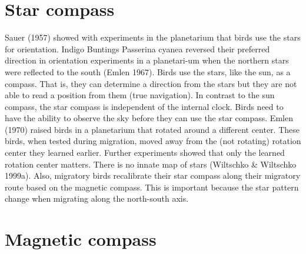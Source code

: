 \documentclass[
]{book}
\begin{document}
\hypertarget{star-compass}{%
\section{Star compass}\label{star-compass}}

Sauer (1957) showed with experiments in the planetarium that birds use the stars for orientation. Indigo Buntings Passerina cyanea reversed their preferred direction in orientation experiments in a planetari-um when the northern stars were reflected to the south (Emlen 1967). Birds use the stars, like the sun, as a compass. That is, they can determine a direction from the stars but they are not able to read a position from them (true navigation). In contrast to the sun compass, the star compass is independent of the internal clock. Birds need to have the ability to observe the sky before they can use the star compass. Emlen (1970) raised birds in a planetarium that rotated around a different center. These birds, when tested during migration, moved away from the (not rotating) rotation center they learned earlier. Further experiments showed that only the learned rotation center matters. There is no innate map of stars (Wiltschko \& Wiltschko 1999a). Also, migratory birds recalibrate their star compass along their migratory route based on the magnetic compass. This is important because the star pattern change when migrating along the north-south axis.

\hypertarget{magnetic-compass}{%
\section{Magnetic compass}\label{magnetic-compass}}
\end{document}
